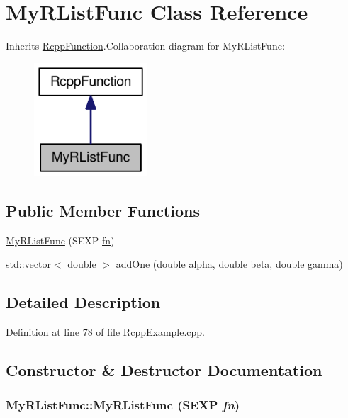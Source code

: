 \hypertarget{classMyRListFunc}{
\section{MyRListFunc Class Reference}
\label{classMyRListFunc}
}


Inherits \hyperlink{classRcppFunction}{RcppFunction}.Collaboration diagram for MyRListFunc:\nopagebreak
\begin{figure}[H]
\begin{center}
\leavevmode
\includegraphics[width=120pt]{classMyRListFunc__coll__graph}
\end{center}
\end{figure}
\subsection*{Public Member Functions}
\begin{DoxyCompactItemize}
\item 
\hyperlink{classMyRListFunc_a7ab78b186d110497a404f88009455af6}{MyRListFunc} (SEXP \hyperlink{classRcppFunction_aa6b5966224b8b7d158be6cdfc3612063}{fn})
\item 
std::vector$<$ double $>$ \hyperlink{classMyRListFunc_a0dec3b59e1e235c0502594a5d92cae13}{addOne} (double alpha, double beta, double gamma)
\end{DoxyCompactItemize}


\subsection{Detailed Description}


Definition at line 78 of file RcppExample.cpp.

\subsection{Constructor \& Destructor Documentation}
\hypertarget{classMyRListFunc_a7ab78b186d110497a404f88009455af6}{
\subsubsection[{MyRListFunc}]{\setlength{\rightskip}{0pt plus 5cm}MyRListFunc::MyRListFunc (SEXP {\em fn})}}
\label{classMyRListFunc_a7ab78b186d110497a404f88009455af6}


